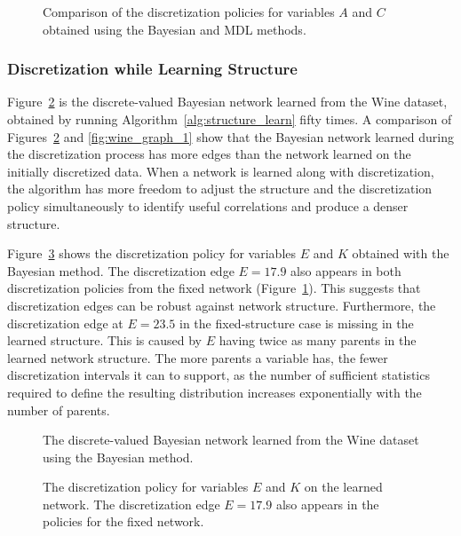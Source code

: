 \begin{figure}[ht]
  \centering
  
  \caption{Comparison of the discretization policies for variables $A$ and $C$ obtained using the Bayesian and MDL methods.}
  \label{fig:wine_exp1_distr}
\end{figure}

\subsubsection{Discretization while Learning Structure}
\label{subsubsec:wine_exp2}

Figure~\ref{fig:wine_graph_2} is the discrete-valued Bayesian network learned from the Wine dataset, obtained by running Algorithm~\ref{alg:structure_learn} fifty times.
A comparison of Figures~\ref{fig:wine_graph_2} and \ref{fig:wine_graph_1} show that the Bayesian network learned during the discretization process has more edges than the network learned on the initially discretized data.
When a network is learned along with discretization, the algorithm has more freedom to adjust the structure and the discretization policy simultaneously to identify useful correlations and produce a denser structure.

Figure~\ref{fig:wine_exp2_distr} shows the discretization policy for variables $E$ and $K$ obtained with the Bayesian method.
The discretization edge $E = 17.9$ also appears in both discretization policies from the fixed network (Figure~\ref{fig:wine_exp1_distr}).
This suggests that discretization edges can be robust against network structure.
Furthermore, the discretization edge at $E = 23.5$ in the fixed-structure case is missing in the learned structure.
This is caused by $E$ having twice as many parents in the learned network structure.
The more parents a variable has, the fewer discretization intervals it can to support, as the number of sufficient statistics required to define the resulting distribution increases exponentially with the number of parents.

\begin{figure}[ht]
  \centering
  \scalebox{0.7}{}
  \caption{The discrete-valued Bayesian network learned from the Wine dataset using the Bayesian method.}
  \label{fig:wine_graph_2}
\end{figure}

\begin{figure}[ht]
  \centering
  
  \caption{
    The discretization policy for variables $E$ and $K$ on the learned network.
    The discretization edge $E = 17.9$ also appears in the policies for the fixed network.
  }
  \label{fig:wine_exp2_distr}
\end{figure}
%
%
